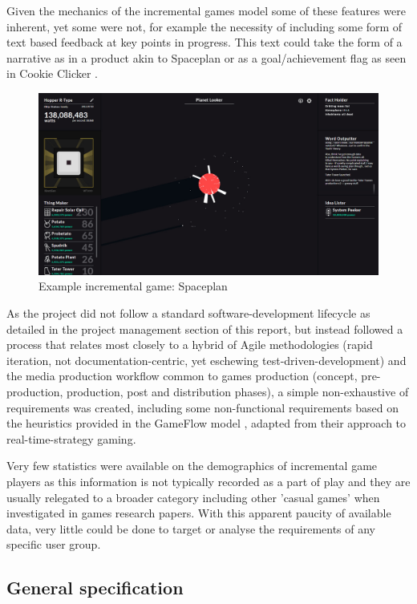 \documentclass[twoside]{bhamthesis}
\begin{document}
Given the mechanics of the incremental games model some of these features were inherent, yet some were not, for example the necessity of including some form of text based feedback at key points in progress. This text could take the form of a narrative as in a product akin to Spaceplan \cite{hollands_spaceplan_2017} or as a goal/achievement flag as seen in Cookie Clicker \cite{ortiel_cookie_2017}.

\begin{figure}[h!]
  \includegraphics[width=\linewidth]{images/spaceplan.jpg}
  \caption{Example incremental game: Spaceplan}
  \label{fig:spaceplan}
\end{figure}

As the project did not follow a standard software-development lifecycle as detailed in the project management section of this report, but instead followed a process that relates most closely to a hybrid of Agile methodologies (rapid iteration, not documentation-centric, yet eschewing test-driven-development) and the media production workflow common to games production (concept, pre-production, production, post and distribution phases), a simple non-exhaustive of requirements was created, including some non-functional requirements based on the heuristics provided in the GameFlow model \cite{sweetser_gameflow_2012}, adapted from their approach to real-time-strategy gaming.

Very few statistics were available on the demographics of incremental game players as this information is not typically recorded as a part of play and they are usually relegated to a broader category including other 'casual games' when investigated in games research papers. With this apparent paucity of available data, very little could be done to target or analyse the requirements of any specific user group.

\subsection{General specification}
\end{document}
